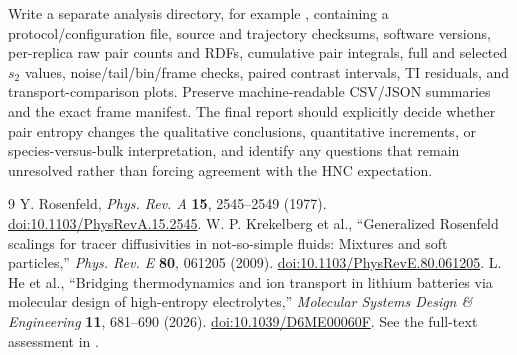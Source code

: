 \documentclass[11pt,a4paper]{article}
\begin{document}
Write a separate analysis directory, for example
, containing a protocol/configuration file,
source and trajectory checksums, software versions, per-replica raw pair
counts and RDFs, cumulative pair integrals, full and selected $s_2$ values,
noise/tail/bin/frame checks, paired contrast intervals, TI residuals, and
transport-comparison plots. Preserve machine-readable CSV/JSON summaries
and the exact frame manifest. The final report should explicitly decide
whether pair entropy changes the qualitative conclusions, quantitative
increments, or species-versus-bulk interpretation, and identify any questions
that remain unresolved rather than forcing agreement with the HNC expectation.

\begin{thebibliography}{9}
\small
{}
Y. Rosenfeld, \textit{Phys. Rev. A} \textbf{15}, 2545--2549 (1977).
\href{https://doi.org/10.1103/PhysRevA.15.2545}{doi:10.1103/PhysRevA.15.2545}.
W. P. Krekelberg et al., ``Generalized Rosenfeld scalings for tracer diffusivities
in not-so-simple fluids: Mixtures and soft particles,'' \textit{Phys. Rev. E}
\textbf{80}, 061205 (2009).
\href{https://doi.org/10.1103/PhysRevE.80.061205}{doi:10.1103/PhysRevE.80.061205}.
L. He et al., ``Bridging thermodynamics and ion transport in lithium batteries
via molecular design of high-entropy electrolytes,''
\textit{Molecular Systems Design \& Engineering} \textbf{11}, 681--690 (2026).
\href{https://doi.org/10.1039/D6ME00060F}{doi:10.1039/D6ME00060F}.
See the full-text assessment in .
\end{thebibliography}
\end{document}
